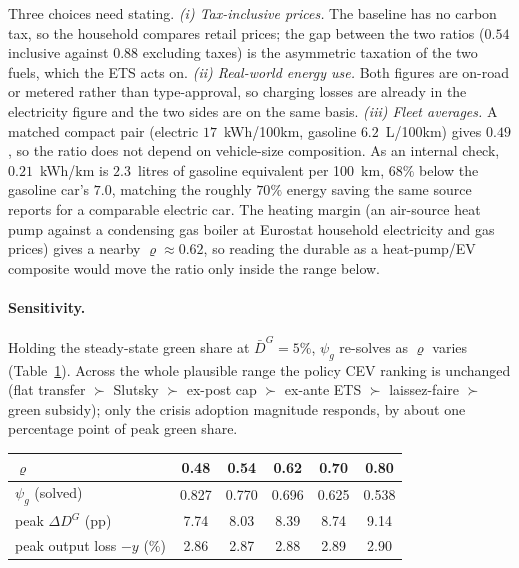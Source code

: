 Three choices need stating. \emph{(i) Tax-inclusive prices.} The baseline has
no carbon tax, so the household compares retail prices; the gap between the two
ratios ($0.54$ inclusive against $0.88$ excluding taxes) is the asymmetric
taxation of the two fuels, which the ETS acts on.
\emph{(ii) Real-world energy use.} Both figures are on-road or metered rather than
type-approval, so charging losses are already in the electricity figure and the two
sides are on the same basis. \emph{(iii) Fleet averages.} A matched compact pair
(electric $17$~kWh/100km, gasoline $6.2$~L/100km) gives $0.49$, so the ratio does
not depend on vehicle-size composition. As an internal check, $0.21$~kWh/km is
$2.3$~litres of gasoline equivalent per 100~km, $68\%$ below the gasoline car's
$7.0$, matching the roughly $70\%$ energy saving the same source reports for a
comparable electric car. The heating margin (an air-source heat pump against a
condensing gas boiler at Eurostat household electricity and gas prices) gives a
nearby $\varrho\approx0.62$, so reading the durable as a heat-pump/EV composite
would move the ratio only inside the range below.

\paragraph{Sensitivity.} Holding the steady-state green share at $\bar D^G=5\%$,
$\psi_g$ re-solves as $\varrho$ varies (Table~\ref{tab:rho_sensitivity}). Across
the whole plausible range the policy CEV ranking is unchanged (flat transfer $\succ$ Slutsky $\succ$ ex-post cap
$\succ$ ex-ante ETS $\succ$ laissez-faire $\succ$ green subsidy); only the crisis
adoption magnitude responds, by about one percentage point of peak green share.

\begin{table}[H]\centering
{}
\small
\begin{tabular}{lccccc}
\toprule
$\varrho$                       & 0.48 & 0.54 & 0.62 & 0.70 & 0.80 \\
\midrule
$\psi_g$ (solved)               & 0.827 & 0.770 & 0.696 & 0.625 & 0.538 \\
peak $\Delta D^G$ (pp)          & 7.74  & 8.03  & 8.39  & 8.74  & 9.14 \\
peak output loss $-y$ (\%)      & 2.86  & 2.87  & 2.88  & 2.89  & 2.90 \\
\bottomrule
\end{tabular}
\label{tab:rho_sensitivity}
\end{table}
